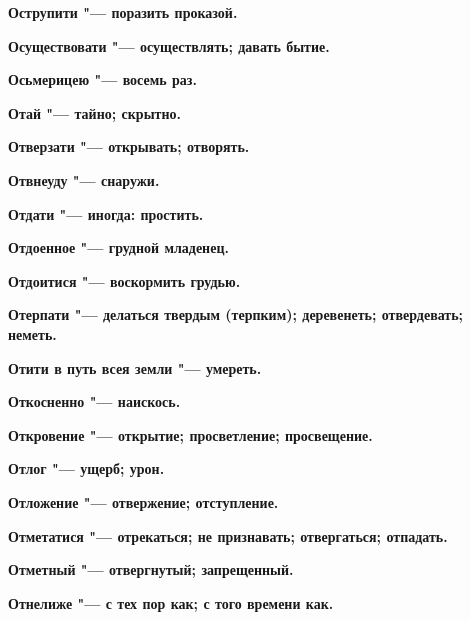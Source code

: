 \begin{mymulticols}{2}
\bfseries Острупити\normalfont{} "--- поразить проказой. 




\bfseries Осуществовати\normalfont{} "--- осуществлять; давать бытие. 




\bfseries Осьмерицею\normalfont{} "--- восемь раз. 




\bfseries Отай\normalfont{} "--- тайно; скрытно. 




\bfseries Отверзати\normalfont{} "--- открывать; отворять. 




\bfseries Отвнеуду\normalfont{} "--- снаружи. 




\bfseries Отдати\normalfont{} "--- иногда: простить. 




\bfseries Отдоенное\normalfont{} "--- грудной младенец. 




\bfseries Отдоитися\normalfont{} "--- воскормить грудью. 




\bfseries Отерпати\normalfont{} "--- делаться твердым (терпким); деревенеть; отвердевать; неметь. 




\bfseries Отити в путь всея земли\normalfont{} "--- умереть. 




\bfseries Откосненно\normalfont{} "--- наискось. 




\bfseries Откровение\normalfont{} "--- открытие; просветление; просвещение. 




\bfseries Отлог\normalfont{} "--- ущерб; урон. 




\bfseries Отложение\normalfont{} "--- отвержение; отступление. 




\bfseries Отметатися\normalfont{} "--- отрекаться; не признавать; отвергаться; отпадать. 




\bfseries Отметный\normalfont{} "--- отвергнутый; запрещенный. 




\bfseries Отнелиже\normalfont{} "--- с тех пор как; с того времени как. 





\end{mymulticols}
